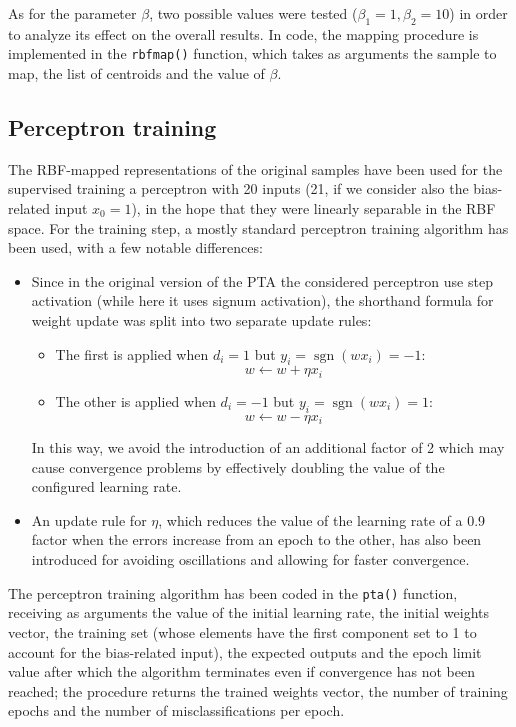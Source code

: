 \documentclass[letterpaper,headings=standardclasses]{scrartcl}
\DeclareMathOperator{\sgn}{sgn}
\begin{document}
As for the parameter $\beta$, two possible values were tested ($\beta_1 = 1, \beta_2 = 10$) in order to analyze its effect on the overall results. In code, the mapping procedure is implemented in the \texttt{rbfmap()} function, which takes as arguments the sample to map, the list of centroids and the value of $\beta$.

\subsection{Perceptron training}

The RBF-mapped representations of the original samples have been used for the supervised training a perceptron with 20 inputs (21, if we consider also the bias-related input $x_0 = 1$), in the hope that they were linearly separable in the RBF space. For the training step, a mostly standard perceptron training algorithm has been used, with a few notable differences:

\begin{itemize}
    \item Since in the original version of the PTA the considered perceptron use step activation (while here it uses signum activation), the shorthand formula for weight update was split into two separate update rules:
    \begin{itemize}
        \item The first is applied when $d_i = 1$ but $y_i = \sgn{(wx_i)} = -1$:
        $$ w \gets w + \eta x_i $$ 
        \item The other is applied when $d_i = -1$ but $y_i = \sgn{(wx_i)} = 1$:
        $$ w \gets w - \eta x_i $$
    \end{itemize}
    In this way, we avoid the introduction of an additional factor of 2 which may cause convergence problems by effectively doubling the value of the configured learning rate.

    \item An update rule for $\eta$, which reduces the value of the learning rate of a 0.9 factor when the errors increase from an epoch to the other, has also been introduced for avoiding oscillations and allowing for faster convergence.
\end{itemize}

The perceptron training algorithm has been coded in the \texttt{pta()} function, receiving as arguments the value of the initial learning rate, the initial weights vector, the training set (whose elements have the first component set to 1 to account for the bias-related input), the expected outputs and the epoch limit value after which the algorithm terminates even if convergence has not been reached; the procedure returns the trained weights vector, the number of training epochs and the number of misclassifications per epoch.
\end{document}
